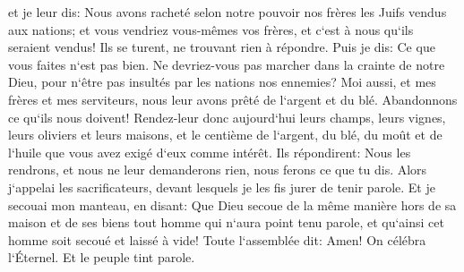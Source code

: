 \verse et je leur dis: Nous avons racheté selon notre pouvoir nos frères les Juifs vendus aux nations; et vous vendriez vous-mêmes vos frères, et c`est à nous qu`ils seraient vendus! Ils se turent, ne trouvant rien à répondre. 
\verse Puis je dis: Ce que vous faites n`est pas bien. Ne devriez-vous pas marcher dans la crainte de notre Dieu, pour n`être pas insultés par les nations nos ennemies? 
\verse Moi aussi, et mes frères et mes serviteurs, nous leur avons prêté de l`argent et du blé. Abandonnons ce qu`ils nous doivent! 
\verse Rendez-leur donc aujourd`hui leurs champs, leurs vignes, leurs oliviers et leurs maisons, et le centième de l`argent, du blé, du moût et de l`huile que vous avez exigé d`eux comme intérêt. 
\verse Ils répondirent: Nous les rendrons, et nous ne leur demanderons rien, nous ferons ce que tu dis. Alors j`appelai les sacrificateurs, devant lesquels je les fis jurer de tenir parole. 
\verse Et je secouai mon manteau, en disant: Que Dieu secoue de la même manière hors de sa maison et de ses biens tout homme qui n`aura point tenu parole, et qu`ainsi cet homme soit secoué et laissé à vide! Toute l`assemblée dit: Amen! On célébra l`Éternel. Et le peuple tint parole. 
